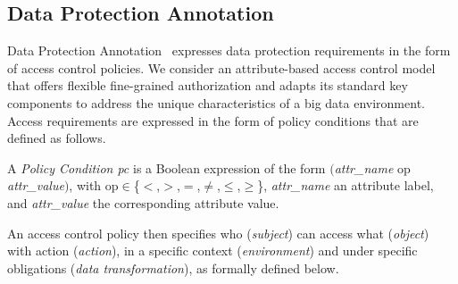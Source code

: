       \subsection{Data Protection Annotation}\label{sec:nonfuncannotation}
      Data Protection Annotation \myLambda\ expresses data protection requirements in the form of access control policies. We consider an attribute-based access control model that offers flexible fine-grained authorization and adapts its standard key components to address the unique characteristics of a big data environment. Access requirements are expressed in the form of policy conditions that are defined as follows.

      \begin{definition}\label{def:policy_cond}
        A \emph{Policy Condition pc} is a Boolean expression of the form $($\emph{attr\_name} op \emph{attr\_value}$)$, with op$\in$\{$<$,$>$,$=$,$\neq$,$\leq$,$\geq$\}, \emph{attr\_name} an attribute label, and \emph{attr\_value} the corresponding attribute value.
      \end{definition}

      An access control policy then specifies who (\emph{subject}) can access what (\emph{object}) with action (\emph{action}), in a specific context (\emph{environment}) and under specific obligations (\emph{data transformation}), as formally defined below.

